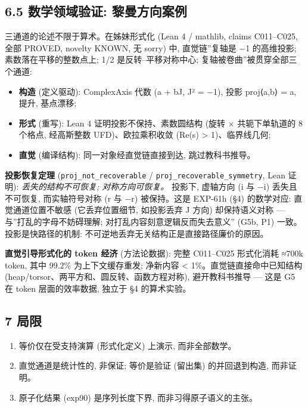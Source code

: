 \documentclass[
]{article}
\providecommand{\tightlist}{%
  \setlength{\itemsep}{0pt}\setlength{\parskip}{0pt}}
\begin{document}
\subsection{6.5 数学领域验证:
黎曼方向案例}\label{ux6570ux5b66ux9886ux57dfux9a8cux8bc1-ux9eceux66fcux65b9ux5411ux6848ux4f8b}

三通道的论述不限于算术。在姊妹形式化 (Lean 4 / mathlib, claims
C011--C025, 全部 PROVED, novelty KNOWN, 无 sorry) 中, 直觉链''复轴是 −1
的高维投影; 素数落在平移的整数点上; 1/2 是反转--平移对称中心;
复轴被卷曲''被贯穿全部三个通道:

\begin{itemize}
\tightlist
\item
  \textbf{构造} (定义驱动): ComplexAxis 代数 (a + bJ, J² = −1), 投影
  proj⟨a,b⟩ = a, 提升, 基点漂移;
\item
  \textbf{形式} (重写): Lean 4 证明投影不保持、素数圆结构 (旋转 ×
  共轭下单轨道的 8 个格点, 经高斯整数 UFD)、欧拉乘积收敛 (Re(s)
  \textgreater{} 1)、临界线几何;
\item
  \textbf{直觉} (编译结构): 同一对象经直觉链直接到达, 跳过教科书推导。
\end{itemize}

\textbf{投影恢复定理} (\texttt{proj\_not\_recoverable} /
\texttt{proj\_recoverable\_symmetry}, Lean 证明):
\emph{丢失的结构不可恢复; 对称方向可恢复。} 投影下, 虚轴方向 (i 与 −i)
丢失且不可恢复, 而实轴符号对称 (r 与 −r) 被保持。这是 EXP-61h (§4)
的数学对应: 直觉通道位置不敏感 (它丢弃位置细节, 如投影丢弃 J 方向)
却保持语义对称 --- 与''打乱的字母不妨碍理解;
对打乱内容刻意逻辑反而失去意义'' (G5b, P1) 一致。投影是快路径的机制:
不可逆地丢弃无关结构正是直接路径廉价的原因。

\textbf{直觉引导形式化的 token 经济} (方法论数据): 完整 C011--C025
形式化消耗 ≈700k token, 其中 99.2\% 为上下文缓存重发; 净新内容
\textless{} 1\%。直觉链直接命中已知结构
(heap/torsor、两平方和、圆反转、函数方程对称), 避开教科书推导 --- 这是
G5 在 token 层面的效率数据, 独立于 §4 的算术实验。

\subsection{7 局限}\label{ux5c40ux9650}

\begin{enumerate}
\def\labelenumi{\arabic{enumi}.}
\tightlist
\item
  等价仅在受支持演算 (形式化定义) 上演示, 而非全部数学。
\item
  直觉通道是统计性的, 非保证; 等价是验证 (留出集) 的并回退到构造,
  而非证明。
\item
  原子化结果 (exp90) 是序列长度下界, 而非习得原子语义的主张。
\end{enumerate}
\end{document}
